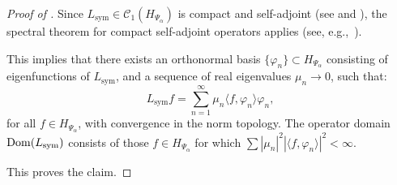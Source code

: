 \begin{proof}[Proof of ]
Since \( L_{\mathrm{sym}} \in \mathcal{C}_1(H_{\Psi_\alpha}) \) is compact and self-adjoint (see  and ), the spectral theorem for compact self-adjoint operators applies (see, e.g.,~\cite[Ch.~VII]{ReedSimon1980I}).

This implies that there exists an orthonormal basis \( \{ \varphi_n \} \subset H_{\Psi_\alpha} \) consisting of eigenfunctions of \( L_{\mathrm{sym}} \), and a sequence of real eigenvalues \( \mu_n \to 0 \), such that:
\[
L_{\mathrm{sym}} f = \sum_{n=1}^\infty \mu_n \langle f, \varphi_n \rangle \varphi_n,
\]
for all \( f \in H_{\Psi_\alpha} \), with convergence in the norm topology. The operator domain \( \operatorname{Dom}(L_{\mathrm{sym}}) \) consists of those \( f \in H_{\Psi_\alpha} \) for which \( \sum |\mu_n|^2 |\langle f, \varphi_n \rangle|^2 < \infty \).

This proves the claim.
\end{proof}
